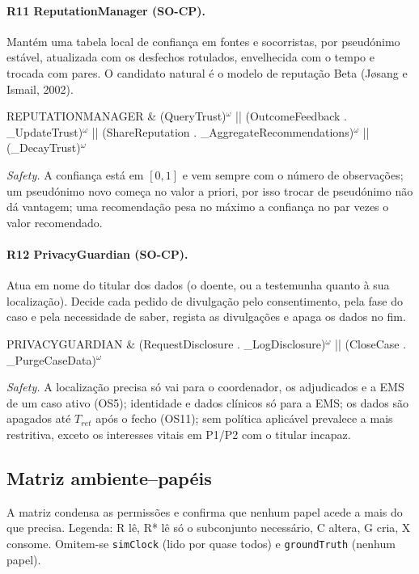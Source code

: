 \documentclass[10pt,a4paper]{article}
\makeatletter
\newenvironment{liveness}
  {\par\smallskip\noindent\small
   \tabularx{\linewidth}{@{\hspace{1em}}>{\ttfamily}l@{\hspace{0.5em}=\hspace{0.5em}}>{\ttfamily\raggedright\arraybackslash}X@{}}}
  {\endtabularx\par\smallskip}
\newcommand{\om}{$^{\omega}$}
\newcommand{\id}[1]{\texttt{#1}}
\makeatother
\begin{document}
\paragraph{R11 ReputationManager (SO-CP).} Mantém uma tabela local de confiança em fontes e socorristas, por pseudónimo estável, atualizada com os desfechos rotulados, envelhecida com o tempo e trocada com pares. O candidato natural é o modelo de reputação Beta (Jøsang e Ismail, 2002).
\begin{liveness}
REPUTATIONMANAGER & (QueryTrust)\om{} || (OutcomeFeedback . \_UpdateTrust)\om{} || (ShareReputation . \_AggregateRecommendations)\om{} || (\_DecayTrust)\om \\
\end{liveness}
\textit{Safety.} A confiança está em $[0, 1]$ e vem sempre com o número de observações; um pseudónimo novo começa no valor a priori, por isso trocar de pseudónimo não dá vantagem; uma recomendação pesa no máximo a confiança no par vezes o valor recomendado.

\paragraph{R12 PrivacyGuardian (SO-CP).} Atua em nome do titular dos dados (o doente, ou a testemunha quanto à sua localização). Decide cada pedido de divulgação pelo consentimento, pela fase do caso e pela necessidade de saber, regista as divulgações e apaga os dados no fim.
\begin{liveness}
PRIVACYGUARDIAN & (RequestDisclosure . \_LogDisclosure)\om{} || (CloseCase . \_PurgeCaseData)\om \\
\end{liveness}
\textit{Safety.} A localização precisa só vai para o coordenador, os adjudicados e a EMS de um caso ativo (OS5); identidade e dados clínicos só para a EMS; os dados são apagados até $T_{ret}$ após o fecho (OS11); sem política aplicável prevalece a mais restritiva, exceto os interesses vitais em P1/P2 com o titular incapaz.

\subsection{Matriz ambiente--papéis}\label{sec:matriz}

A matriz condensa as permissões e confirma que nenhum papel acede a mais do que precisa. Legenda: R lê, R* lê só o subconjunto necessário, C altera, G cria, X consome. Omitem-se \id{simClock} (lido por quase todos) e \id{groundTruth} (nenhum papel).
\end{document}
